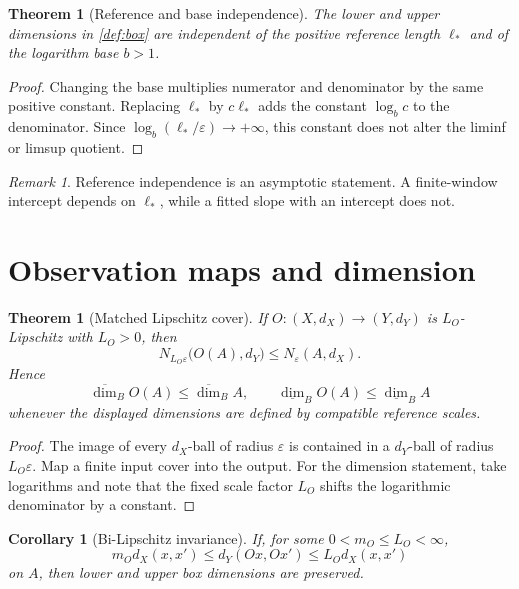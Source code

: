 \documentclass[11pt,a4paper]{article}
\theoremstyle{definition}
\theoremstyle{plain}
\newtheorem{theorem}[definition]{Theorem}
\newtheorem{corollary}[definition]{Corollary}
\theoremstyle{remark}
\newtheorem{remark}[definition]{Remark}
\begin{document}
\begin{theorem}[Reference and base independence]
\label{thm:reference}
The lower and upper dimensions in \cref{def:box} are independent of the
positive reference length $\ell_*$ and of the logarithm base $b>1$.
\end{theorem}

\begin{proof}
Changing the base multiplies numerator and denominator by the same
positive constant. Replacing $\ell_*$ by $c\ell_*$ adds the constant
$\log_b c$ to the denominator. Since
$\log_b(\ell_*/\varepsilon)\to+\infty$, this constant does not alter the
liminf or limsup quotient.
\end{proof}

\begin{remark}
Reference independence is an asymptotic statement. A finite-window
intercept depends on $\ell_*$, while a fitted slope with an intercept does
not.
\end{remark}

\section{Observation maps and dimension}

\begin{theorem}[Matched Lipschitz cover]
\label{thm:lipschitz}
If $O:(X,d_X)\to(Y,d_Y)$ is $L_O$-Lipschitz with $L_O>0$, then
\[
 N_{L_O\varepsilon}\bigl(O(A),d_Y\bigr)
 \leq
 N_\varepsilon(A,d_X).
\]
Hence
\[
 \overline{\dim}_B O(A)\leq\overline{\dim}_B A,
\qquad
 \underline{\dim}_B O(A)\leq\underline{\dim}_B A
\]
whenever the displayed dimensions are defined by compatible reference
scales.
\end{theorem}

\begin{proof}
The image of every $d_X$-ball of radius $\varepsilon$ is contained in a
$d_Y$-ball of radius $L_O\varepsilon$. Map a finite input cover into the
output. For the dimension statement, take logarithms and note that the
fixed scale factor $L_O$ shifts the logarithmic denominator by a constant.
\end{proof}

\begin{corollary}[Bi-Lipschitz invariance]
\label{cor:bilip}
If, for some $0<m_O\leq L_O<\infty$,
\[
m_Od_X(x,x')
\leq d_Y(Ox,Ox')
\leq L_Od_X(x,x')
\]
on $A$, then lower and upper box dimensions are preserved.
\end{corollary}
\end{document}
